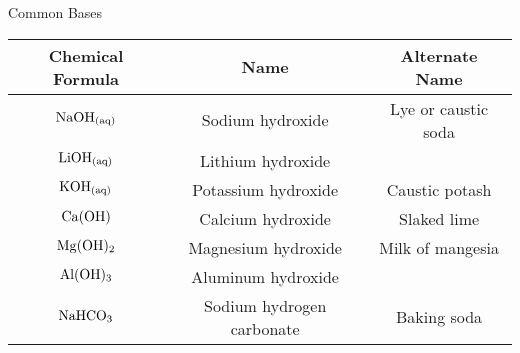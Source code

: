 \documentclass[12pt]{report}
\begin{document}
\begin{table}[h!] %

    \renewcommand{\arraystretch}{1.5} %
    \setlength{\tabcolsep}{10pt} %
    \setlength{\arrayrulewidth}{0.25mm}

    \begin{center}
        Common Bases \\
        \vspace{0.5em}
        \begin{tabular}{|c|c|c|} %
        \hline
        Chemical Formula & Name & Alternate Name\\ %
        \hline
        $\ce{NaOH_{(aq)}}$ & Sodium hydroxide & Lye or caustic soda \\ %
        \hline 
        $\ce{LiOH_{(aq)}}$ & Lithium hydroxide & \\ 
        \hline 
        $\ce{KOH_{(aq)}}$ & Potassium hydroxide & Caustic potash\\ 
        \hline 
        $\ce{Ca(OH)}$ & Calcium hydroxide & Slaked lime\\ 
        \hline
        $\ce{Mg(OH)2}$ & Magnesium hydroxide & Milk of mangesia\\ 
        \hline 
        $\ce{Al(OH)3}$ & Aluminum hydroxide & \\
        \hline 
        $\ce{NaHCO3}$ & Sodium hydrogen carbonate & Baking soda\\
        \hline
        \end{tabular}
    \end{center}
\end{table}
\end{document}
